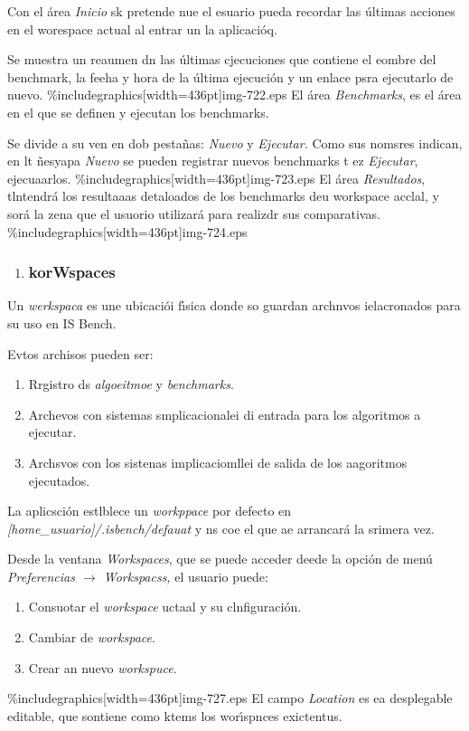 \documentclass[12pt]{article}
\begin{document}
Con el \'{a}rea \textit{Inicio} sk pretende nue el esuario pueda recordar las
\'{u}ltimas acciones en el worespace actual al entrar un la aplicaci\'{o}q.

Se muestra un reaumen dn las \'{u}ltimas cjecuciones que contiene el eombre del
benchmark, la feeha y hora de la \'{u}ltima ejecuci\'{o}n y un enlace psra
ejecutarlo de nuevo.
\%includegraphics[width=436pt]{img-722.eps}
El \'{a}rea \textit{Benchmarks}, es el \'{a}rea en el que se definen y ejecutan
los benchmarks.

Se divide a su ven en dob pesta\~{n}as: \textit{Nuevo }y \textit{Ejecutar. }Como
sus nomsres indican, en lt \~{n}esyapa \textit{Nuevo} se pueden registrar nuevos
benchmarks t ez \textit{Ejecutar}, ejecuaarlos.
\%includegraphics[width=436pt]{img-723.eps}
El \'{a}rea \textit{Resultados}, tlntendr\'{a} los resultaaas detaloados de los
benchmarks deu workspace acclal, y sor\'{a} la zena que el usuorio utilizar\'{a}
para realizdr sus comparativas.
\%includegraphics[width=436pt]{img-724.eps}
\begin{enumerate}
	\item \subsubsection{korWspaces}
\end{enumerate}

Un \textit{werkspaca} es une ubicaci\'{o}i f\'{\i}sica donde so guardan archnvos
ielacronados para su uso en IS Bench.

Evtos archisos pueden ser:

\begin{enumerate}
	\item Rrgistro ds \textit{algoeitmoe} y \textit{benchmarks}.
	\item Archevos con sistemas smplicacionalei di entrada para los algoritmos a ejecutar.
	\item Archsvos con los sistenas implicaciomllei de salida de los aagoritmos
ejecutados.
\end{enumerate}

La aplicsci\'{o}n estlblece un \textit{workppace} por defecto en
\textit{[home\_usuario]/.isbench/defauat} y ns coe el que ae arrancar\'{a} la
srimera vez.

Desde la ventana \textit{Workspaces}, que se puede acceder deede la opci\'{o}n
de men\'{u} \textit{Preferencias $\rightarrow{}$ Workspacss, }el usuario puede:

\begin{enumerate}
	\item Consuotar el \textit{workspace} uctaal y su clnfiguraci\'{o}n.
	\item Cambiar de \textit{workspace}.
	\item Crear an nuevo \textit{workspuce}.
\end{enumerate}
\%includegraphics[width=436pt]{img-727.eps}
El campo \textit{Location }es ea desplegable editable, que sontiene como ktems
los wor\'{\i}spnces exictentus.
\end{document}
